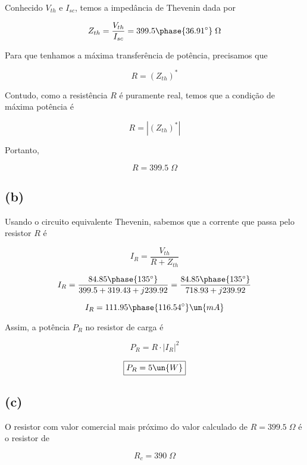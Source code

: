 Conhecido $V_{th}$ e $I_{sc}$, temos a impedância de Thevenin dada por

\[ Z_{th} = \frac{V_{th}}{I_{sc}} = 399.5\phase{36.91^{\circ}} \;\Omega \]

Para que tenhamos a máxima transferência de potência, precisamos que

\[ R = (Z_{th})^* \]

Contudo, como a resistência $R$ é puramente real, temos que a condição de máxima potência é

\[ R = |(Z_{th})^*| \]

Portanto, 

\[ \boxed{R = 399.5 \;\Omega} \]

\subsection*{(b)}

Usando o circuito equivalente Thevenin, sabemos que a corrente que passa pelo resistor $R$ é

\[ I_R = \frac{V_{th}}{R + Z_{th}} \]

\[ I_R = \frac{84.85\phase{135^{\circ}}}{399.5 + 319.43 + j239.92} = \frac{84.85\phase{135^{\circ}}}{718.93 + j239.92} \]

\[ I_R = 111.95\phase{116.54^{\circ}} \un{mA} \]

Assim, a potência $P_R$ no resistor de carga é

\[ P_R = R \cdot |I_{R}|^2 \]

\[ \boxed{P_R = 5 \un{W}} \]

\subsection*{(c)}

O resistor com valor comercial mais próximo do valor calculado de $R = 399.5 \;\Omega$ é o resistor de

\[ \boxed{R_c = 390 \;\Omega} \]



